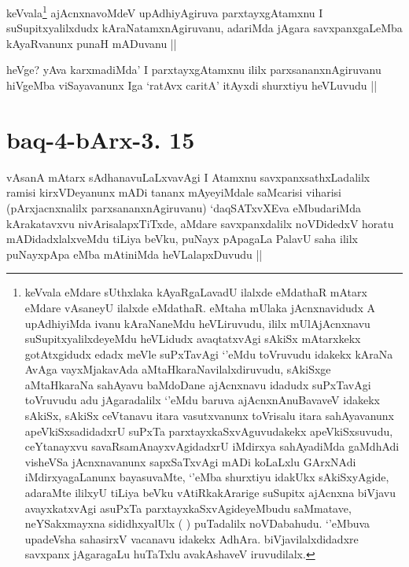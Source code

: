 \begin{artha}
keVvala\footnote{keVvala eMdare sUthxlaka kAyaRgaLavadU ilalxde eMdathaR mAtarx eMdare vAsaneyU ilalxde eMdathaR. eMtaha mUlaka jAcnxnavidudx A upAdhiyiMda ivanu kAraNaneMdu heVLiruvudu, ililx mUlAjAcnxnavu suSupitxyalilxdeyeMdu heVLidudx avaqtatxvAgi sAkiSx mAtarxkekx gotAtxgidudx edadx meVle suPxTavAgi `\stext'eMdu toVruvudu idakekx kAraNa AvAga vayxMjakavAda aMtaHkaraNavilalxdiruvudu, sAkiSxge aMtaHkaraNa sahAyavu baMdoDane ajAcnxnavu idadudx suPxTavAgi toVruvudu adu jAgaradalilx `\stext'eMdu baruva ajAcnxnAnuBavaveV idakekx sAkiSx, sAkiSx ceVtanavu itara vasutxvanunx toVrisalu itara sahAyavanunx apeVkiSxsadidadxrU suPxTa parxtayxkaSxvAguvudakekx apeVkiSxsuvudu, ceYtanayxvu savaRsamAnayxvAgidadxrU iMdirxya sahAyadiMda gaMdhAdi visheVSa jAcnxnavanunx sapxSaTxvAgi mADi koLaLxlu GArxNAdi iMdirxyagaLanunx bayasuvaMte, `\stext'eMba shurxtiyu idakUkx sAkiSxyAgide, adaraMte ililxyU tiLiya beVku vAtiRkakArarige suSupitx ajAcnxna biVjavu avayxkatxvAgi asuPxTa parxtayxkaSxvAgideyeMbudu saMmatave, neYSakxmayxna sididhxyalUlx (   ) puTadalilx noVDabahudu. `\stext'eMbuva upadeVsha sahasirxV vacanavu idakekx AdhAra. biVjavilalxdidadxre savxpanx jAgaragaLu huTaTxlu avakAshaveV iruvudilalx.} ajAcnxnavoMdeV upAdhiyAgiruva parxtayxgAtamxnu I suSupitxyalilxdudx kAraNatamxnAgiruvanu, adariMda jAgara savxpanxgaLeMba kAyaRvanunx punaH mADuvanu ||
\end{artha}

\begin{artha}
heVge? yAva karxmadiMda' I parxtayxgAtamxnu ililx parxsananxnAgiruvanu hiVgeMba viSayavanunx Iga `ratAvx caritA' itAyxdi shurxtiyu heVLuvudu ||
\end{artha}

\section*{baq-4-bArx-3. 15}


\begin{artha}
vAsanA mAtarx sAdhanavuLaLxvavAgi I Atamxnu savxpanxsathxLadalilx ramisi kirxVDeyanunx mADi tananx mAyeyiMdale saMcarisi viharisi (pArxjacnxnalilx parxsananxnAgiruvanu) `daqSATxvXEva eMbudariMda kArakatavxvu nivArisalapxTiTxde, aMdare savxpanxdalilx noVDidedxV horatu mADidadxlalxveMdu tiLiya beVku, puNayx pApagaLa PalavU saha ililx puNayxpApa eMba mAtiniMda heVLalapxDuvudu ||
\end{artha}

